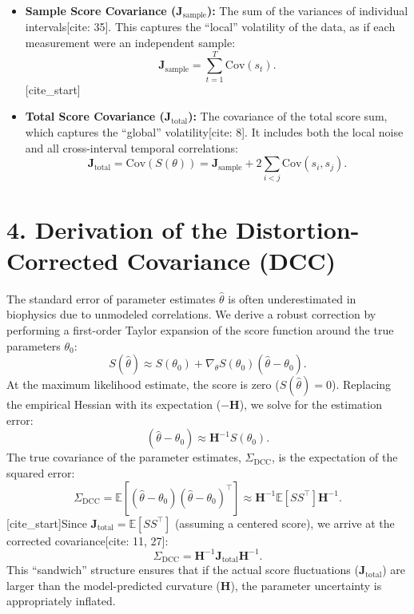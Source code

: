 \documentclass[11pt]{article}
\begin{document}
\begin{itemize}
    [cite_start]\item \textbf{Sample Score Covariance ($\mathbf{J}_{\mathrm{sample}}$):} The sum of the variances of individual intervals[cite: 35]. This captures the ``local'' volatility of the data, as if each measurement were an independent sample:
    \begin{equation}
    \mathbf{J}_{\mathrm{sample}} = \sum_{t=1}^T \mathrm{Cov}(s_t).
    \end{equation}
    [cite_start]\item \textbf{Total Score Covariance ($\mathbf{J}_{\mathrm{total}}$):} The covariance of the total score sum, which captures the ``global'' volatility[cite: 8]. It includes both the local noise and all cross-interval temporal correlations:
    \begin{equation}
    \mathbf{J}_{\mathrm{total}} = \mathrm{Cov}(S(\theta)) = \mathbf{J}_{\mathrm{sample}} + 2\sum_{i<j}\mathrm{Cov}(s_i,s_j).
    \end{equation}
\end{itemize}

\section*{4. Derivation of the Distortion-Corrected Covariance (DCC)}
The standard error of parameter estimates $\hat{\theta}$ is often underestimated in biophysics due to unmodeled correlations. We derive a robust correction by performing a first-order Taylor expansion of the score function around the true parameters $\theta_0$:
\begin{equation}
S(\hat{\theta}) \approx S(\theta_0) + \nabla_\theta S(\theta_0) (\hat{\theta} - \theta_0).
\end{equation}
At the maximum likelihood estimate, the score is zero ($S(\hat{\theta}) = 0$). Replacing the empirical Hessian with its expectation ($-\mathbf{H}$), we solve for the estimation error:
\begin{equation}
(\hat{\theta} - \theta_0) \approx \mathbf{H}^{-1} S(\theta_0).
\end{equation}
The true covariance of the parameter estimates, $\Sigma_{\mathrm{DCC}}$, is the expectation of the squared error:
\begin{equation}
\Sigma_{\mathrm{DCC}} = \mathbb{E}\left[(\hat{\theta} - \theta_0)(\hat{\theta} - \theta_0)^\top\right] \approx \mathbf{H}^{-1} \mathbb{E}[S S^\top] \mathbf{H}^{-1}.
\end{equation}
[cite_start]Since $\mathbf{J}_{\mathrm{total}} = \mathbb{E}[S S^\top]$ (assuming a centered score), we arrive at the corrected covariance[cite: 11, 27]:
\begin{equation}
\Sigma_{\mathrm{DCC}} = \mathbf{H}^{-1} \mathbf{J}_{\mathrm{total}} \mathbf{H}^{-1}.
\end{equation}
This ``sandwich'' structure ensures that if the actual score fluctuations ($\mathbf{J}_{\mathrm{total}}$) are larger than the model-predicted curvature ($\mathbf{H}$), the parameter uncertainty is appropriately inflated.
\end{document}
